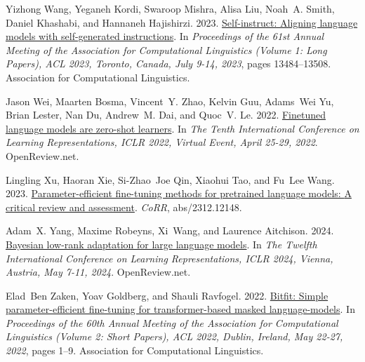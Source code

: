 \documentclass[11pt,dvipsnames]{article}
\begin{document}
{\begin{thebibliography}{73}
Yizhong Wang, Yeganeh Kordi, Swaroop Mishra, Alisa Liu, Noah~A. Smith, Daniel
  Khashabi, and Hannaneh Hajishirzi. 2023.
\newblock \href {https://doi.org/10.18653/v1/2023.acl-long.754} {Self-instruct:
  Aligning language models with self-generated instructions}.
\newblock In \emph{Proceedings of the 61st Annual Meeting of the Association
  for Computational Linguistics (Volume 1: Long Papers), {ACL} 2023, Toronto,
  Canada, July 9-14, 2023}, pages 13484--13508. Association for Computational
  Linguistics.

Jason Wei, Maarten Bosma, Vincent~Y. Zhao, Kelvin Guu, Adams~Wei Yu, Brian
  Lester, Nan Du, Andrew~M. Dai, and Quoc~V. Le. 2022.
\newblock \href {https://openreview.net/forum?id=gEZrGCozdqR} {Finetuned
  language models are zero-shot learners}.
\newblock In \emph{The Tenth International Conference on Learning
  Representations, {ICLR} 2022, Virtual Event, April 25-29, 2022}.
  OpenReview.net.

Lingling Xu, Haoran Xie, Si{-}Zhao~Joe Qin, Xiaohui Tao, and Fu~Lee Wang. 2023.
\newblock \href {https://doi.org/10.48550/ARXIV.2312.12148}
  {Parameter-efficient fine-tuning methods for pretrained language models: {A}
  critical review and assessment}.
\newblock \emph{CoRR}, abs/2312.12148.

Adam~X. Yang, Maxime Robeyns, Xi~Wang, and Laurence Aitchison. 2024.
\newblock \href {https://openreview.net/forum?id=FJiUyzOF1m} {Bayesian low-rank
  adaptation for large language models}.
\newblock In \emph{The Twelfth International Conference on Learning
  Representations, {ICLR} 2024, Vienna, Austria, May 7-11, 2024}.
  OpenReview.net.

Elad~Ben Zaken, Yoav Goldberg, and Shauli Ravfogel. 2022.
\newblock \href {https://doi.org/10.18653/v1/2022.acl-short.1} {Bitfit: Simple
  parameter-efficient fine-tuning for transformer-based masked
  language-models}.
\newblock In \emph{Proceedings of the 60th Annual Meeting of the Association
  for Computational Linguistics (Volume 2: Short Papers), {ACL} 2022, Dublin,
  Ireland, May 22-27, 2022}, pages 1--9. Association for Computational
  Linguistics.


\end{thebibliography}}
\end{document}
